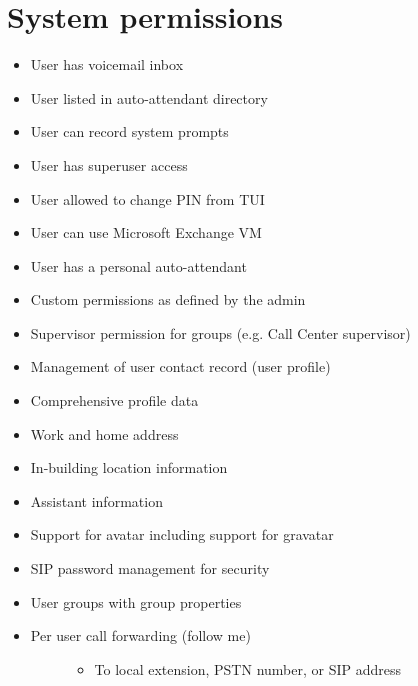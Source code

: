 \documentclass[letterpaper,10pt,english]{sphinxmanual}
\begin{document}
\section{System permissions}
\label{\detokenize{features:system-permissions}}\begin{itemize}
\item {} 
User has voicemail inbox

\item {} 
User listed in auto-attendant directory

\item {} 
User can record system prompts

\item {} 
User has superuser access

\item {} 
User allowed to change PIN from TUI

\item {} 
User can use Microsoft Exchange VM

\item {} 
User has a personal auto-attendant

\item {} 
Custom permissions as defined by the admin

\item {} 
Supervisor permission for groups (e.g. Call Center supervisor)

\item {} 
Management of user contact record (user profile)

\item {} 
Comprehensive profile data

\item {} 
Work and home address

\item {} 
In-building location information

\item {} 
Assistant information

\item {} 
Support for avatar including support for gravatar

\item {} 
SIP password management for security

\item {} 
User groups with group properties

\item {} \begin{description}
\item[{Per user call forwarding (follow me)}] \leavevmode\begin{itemize}
\item {} 
To local extension, PSTN number, or SIP address


\end{itemize}
\end{description}
\end{itemize}
\end{document}
